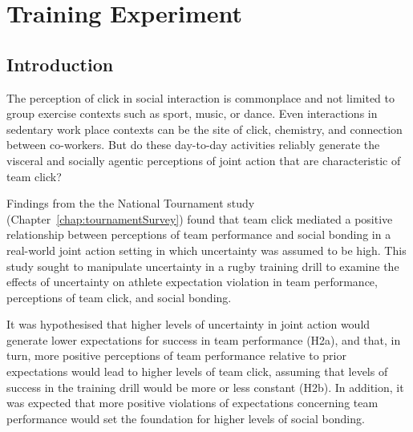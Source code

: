 \begin{savequote}[8cm]

  \qauthor{}
\end{savequote}



\chapter{\label{chap:trainingExperiment}Training Experiment}



                                          \begin{CJK}{UTF8}{gbsn}







\minitoc


\section{Introduction}
The perception of click in social interaction is commonplace and not limited to group exercise contexts such as sport, music, or dance.  Even interactions in sedentary work place contexts can be the site of click, chemistry, and connection between co-workers.   But do these day-to-day activities reliably generate the visceral and socially agentic perceptions of joint action that are characteristic of team click? 

Findings from the the National Tournament study (Chapter~\ref{chap:tournamentSurvey}) found that team click mediated a positive relationship between perceptions of team performance and social bonding in a real-world joint action setting in which uncertainty was assumed to be high.  This study sought to manipulate uncertainty in a rugby training drill to examine the effects of uncertainty on athlete expectation violation in team performance, perceptions of team click, and social bonding.

It was hypothesised that higher levels of uncertainty in joint action would generate lower expectations for success in team performance (H2a), and that, in turn, more positive perceptions of team performance relative to prior expectations would lead to higher levels of team click, assuming that levels of success in the training drill would be more or less constant (H2b).  In addition, it was expected that more positive violations of expectations concerning team performance would set the foundation for higher levels of social bonding.


\end{CJK}
